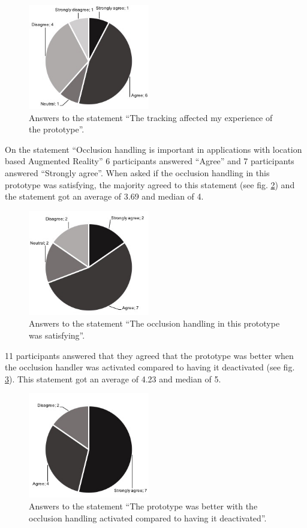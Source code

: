 \begin{figure}
\includegraphics[width=200px, height=174px]{_image_user-tracking}
\caption{Answers to the statement ``The tracking affected my experience of the prototype''.}
\label{fig:_image_user-tracking}
\end{figure}

On the statement ``Occlusion handling is important in applications with location based Augmented Reality'' 6 participants answered ``Agree'' and 7 participants answered ``Strongly agree''. When asked if the occlusion handling in this prototype was satisfying, the majority agreed to this statement (see fig.  \ref{fig:_image_user-satisfying}) and the statement got an average of 3.69 and median of 4.

\begin{figure}
\includegraphics[width=200px, height=174px]{_image_user-satisfying}
\caption{Answers to the statement ``The occlusion handling in this prototype was satisfying''.}
\label{fig:_image_user-satisfying}
\end{figure}

11 participants answered that they agreed that the prototype was better when the occlusion handler was activated compared to having it deactivated (see fig. \ref{fig:_image_user-better}). This statement got an average of 4.23 and median of 5. 

\begin{figure}
\includegraphics[width=200px, height=174px]{_image_user-better}
\caption{Answers to the statement ``The prototype was better with the occlusion handling activated compared to having it deactivated''.}
\label{fig:_image_user-better}
\end{figure}

